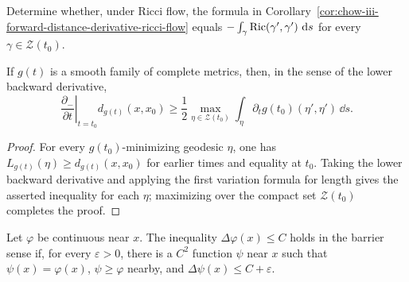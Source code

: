 \begin{example}
\label{ex:chow-iii-distance-derivative-any-minimizer}
Determine whether, under Ricci flow, the formula in
Corollary~\ref{cor:chow-iii-forward-distance-derivative-ricci-flow} equals
\(-\int_\gamma\operatorname{Ric}(\gamma',\gamma')\,\,\mathrm{d} s\) for every
\(\gamma\in\mathcal Z(t_0)\).
\end{example}

\begin{lemma}
\label{lem:chow-iii-backward-distance-derivative}
If \(g(t)\) is a smooth family of complete metrics, then, in the sense of the
lower backward derivative,
\[
 \left.\frac{\partial_-}{\partial t}\right|_{t=t_0}d_{g(t)}(x,x_0)
 \ge\frac12\max_{\eta\in\mathcal Z(t_0)}
 \int_\eta\partial_tg(t_0)(\eta',\eta')\,\dd s.
\]
\end{lemma}
\begin{proof}
For every \(g(t_0)\)-minimizing geodesic \(\eta\), one has
\(L_{g(t)}(\eta)\ge d_{g(t)}(x,x_0)\) for earlier times and equality at
\(t_0\).  Taking the lower backward derivative and applying the first
variation formula for length gives the asserted inequality for each \(\eta\);
maximizing over the compact set \(\mathcal Z(t_0)\) completes the proof.
\end{proof}

\begin{definition}
\label{def:chow-iii-laplacian-upper-barrier}
Let \(\varphi\) be continuous near \(x\).  The inequality
\(\Delta\varphi(x)\le C\) holds in the barrier sense if, for every
\(\varepsilon>0\), there is a \(C^2\) function \(\psi\) near \(x\) such that
\(\psi(x)=\varphi(x)\), \(\psi\ge\varphi\) nearby, and
\(\Delta\psi(x)\le C+\varepsilon\).
\end{definition}

